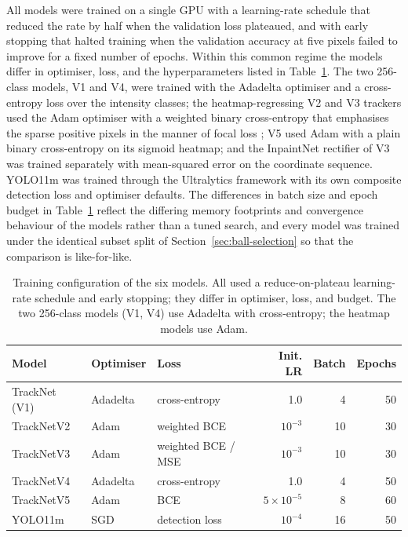 All models were trained on a single GPU with a learning-rate schedule that
reduced the rate by half when the validation loss plateaued, and with early
stopping that halted training when the validation accuracy at five pixels failed
to improve for a fixed number of epochs. Within this common regime the models
differ in optimiser, loss, and the hyperparameters listed in
Table~\ref{tab:ball-train}. The two 256-class models, V1 and V4, were trained
with the Adadelta optimiser and a cross-entropy loss over the intensity classes;
the heatmap-regressing V2 and V3 trackers used the Adam optimiser
\cite{kingma2015adam} with a weighted binary cross-entropy that emphasises the
sparse positive pixels in the manner of focal loss \cite{lin2017focalloss}; V5
used Adam with a plain binary cross-entropy on its sigmoid heatmap; and the
InpaintNet rectifier of V3 was trained separately with mean-squared error on the
coordinate sequence. YOLO11m was trained through the Ultralytics framework with
its own composite detection loss and optimiser defaults. The differences in
batch size and epoch budget in Table~\ref{tab:ball-train} reflect the differing
memory footprints and convergence behaviour of the models rather than a tuned
search, and every model was trained under the identical subset split of
Section~\ref{sec:ball-selection} so that the comparison is like-for-like.

\begin{table}[t]
  \centering
  \small
  \setlength{\tabcolsep}{6pt}
  \caption{Training configuration of the six models. All used a
    reduce-on-plateau learning-rate schedule and early stopping; they differ in
    optimiser, loss, and budget. The two 256-class models (V1, V4) use Adadelta
    with cross-entropy; the heatmap models use Adam.}
  \label{tab:ball-train}
  \begin{tabular}{l l l r r r}
    \toprule
    Model & Optimiser & Loss & \makecell[r]{Init.\\LR} & Batch & Epochs \\
    \midrule
    TrackNet (V1) & Adadelta & cross-entropy        & 1.0   & 4  & 50 \\
    TrackNetV2    & Adam     & weighted BCE         & $10^{-3}$ & 10 & 30 \\
    TrackNetV3    & Adam     & weighted BCE / MSE   & $10^{-3}$ & 10 & 30 \\
    TrackNetV4    & Adadelta & cross-entropy        & 1.0   & 4  & 50 \\
    TrackNetV5    & Adam     & BCE                  & $5\times10^{-5}$ & 8  & 60 \\
    YOLO11m       & SGD      & detection loss       & $10^{-4}$ & 16 & 50 \\
    \bottomrule
  \end{tabular}
\end{table}


